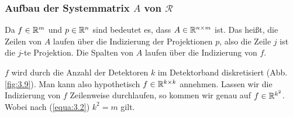 \subsubsection{Aufbau der Systemmatrix $A$ von $\mathcal{R}$}

Da $f \in \mathbb{R}^m$ und $p \in \mathbb{R}^n$ sind bedeutet es, dass $A \in \mathbb{R}^{n\times m}$ ist. Das heißt, die Zeilen von $A$ laufen über die Indizierung der Projektionen $p$, also die Zeile $j$ ist die $j$-te Projektion. Die Spalten von $A$ laufen über die Indizierung von $f$.

$f$ wird durch die Anzahl der Detektoren $k$ im Detektorband diskretisiert (Abb. \ref{fig:3.9}). Man kann also hypothetisch $f \in \mathbb{R}^{k\times k}$ annehmen. Lassen wir die Indizierung von $f$ Zeilenweise durchlaufen, so kommen wir genau auf $f \in \mathbb{R}^{k^2}$. Wobei nach (\ref{equa:3.2}) $k^2= m$ gilt.

